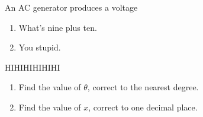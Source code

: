 \begin{shortanswer}
\pagebreak

\begin{shortquestion}{4}        %

An AC generator produces a voltage

\begin{center}
    
\end{center}

\begin{enumerate}
    \item{} What's nine plus ten.
    \item{} You stupid.
    \questionend
\end{enumerate}

\end{shortquestion}
\pagebreak

\begin{shortquestion}{4}        %
HIHIHIHIHIHI
\begin{enumerate}
    \item{} Find the value of $\theta$, correct to the nearest degree.
    \item{} Find the value of $x$, correct to one decimal place.
\end{enumerate}

\end{shortquestion}             %

\end{shortanswer}               %